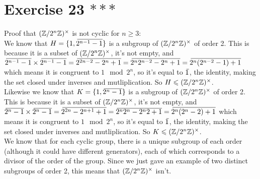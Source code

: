 \documentclass[12pt]{article}
\begin{document}
    \section*{Exercise 23 $***$}
    Proof that $(\mathbb{Z}/2^n\mathbb{Z})^\times$ is not cyclic for $n \geqslant 3$: \\
    We know that $H = \{1, \,\overline{\!{2^{n-1} - 1}}\}$
    is a subgroup of $(\mathbb{Z}/2^n\mathbb{Z})^\times$ of order 2.
    This is because it is a subset of $(\mathbb{Z}/2^n\mathbb{Z})^\times$,
    it's not empty, 
    and $\,\overline{\!{2^{n-1} - 1}} \times \,\overline{\!{2^{n-1} - 1}}
    = \,\overline{\!{2^{2n-2} - 2^n + 1}} = \,\overline{\!{2^n2^{n-2} - 2^n + 1}}
    =  \,\overline{\!{2^n(2^{n-2} - 1) + 1}}$
    which means it is congruent to  $1 \mod 2^n$,
    so it's equal to $\,\overline{\!{1}}$, the identity,
    making the set closed under inverses and mutliplication.
    So $H \leqslant (\mathbb{Z}/2^n\mathbb{Z})^\times$. \\
    Likewise we know that $K = \{1, \,\overline{\!{2^n - 1}}\}$
    is a subgroup of $(\mathbb{Z}/2^n\mathbb{Z})^\times$ of order 2.
    This is because it is a subset of $(\mathbb{Z}/2^n\mathbb{Z})^\times$,
    it's not empty, 
    and $\,\overline{\!{2^n - 1}} \times \,\overline{\!{2^n - 1}}
    = \,\overline{\!{2^{2n} - 2^{n+1} + 1}} = \,\overline{\!{2^n2^n - 2^n2 + 1}}
    =  \,\overline{\!{2^n(2^n - 2) + 1}}$
    which means it is congruent to  $1 \mod 2^n$,
    so it's equal to $\,\overline{\!{1}}$, the identity,
    making the set closed under inverses and mutliplication.
    So $K \leqslant (\mathbb{Z}/2^n\mathbb{Z})^\times$. \\
    We know that for each cyclic group,
    there is a unique subgroup of each order
    (although it could have different generators),
    each of which corresponds to a divisor of the order of the group.
    Since we just gave an example of two distinct
    subgroups of order 2,
    this means that $(\mathbb{Z}/2^n\mathbb{Z})^\times$ isn't.
\end{document}
